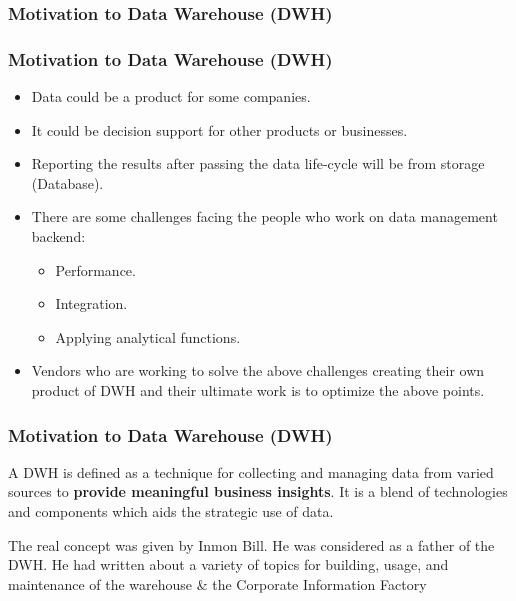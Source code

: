 \subsubsection{Motivation to Data Warehouse (DWH)}
\begin{frame}
\frametitle{Motivation to Data Warehouse (DWH)}
	\begin{itemize}[<+->]
		\item Data could be a product for some companies.
		\item It could be decision support for other products or businesses.
		\item Reporting the results after passing the data life-cycle will be from storage (Database).
		\item There are some challenges facing the people who work on data management backend:
			\begin{itemize}[<+->]
				\item Performance.
				\item Integration.
				\item Applying analytical functions. %
			\end{itemize}
		\item Vendors who are working to solve the above challenges creating their own product of DWH and their ultimate work is to optimize the above points.
	\end{itemize}
\end{frame}
\begin{frame}[c]
\frametitle{Motivation to Data Warehouse (DWH)}

\begin{definition} A DWH is defined as a technique for collecting and managing data from varied sources to \textbf{provide meaningful business insights}. It is a blend of technologies and components which aids the strategic use of data.%
\end{definition}

The real concept was given by Inmon Bill. He was considered as a father of the DWH. He had written about a variety of topics for building, usage, and maintenance of the warehouse \& the Corporate Information Factory


\end{frame}

